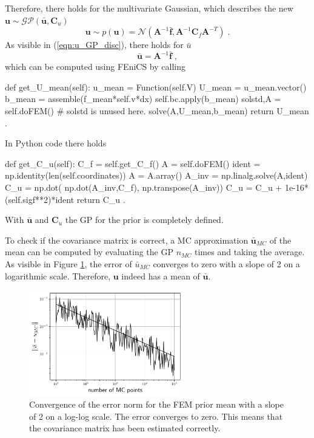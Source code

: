 \documentclass[%
  a4paper,oneside,%
  11pt,%
  smallchapters,
  style=printdev,
  extramargin,
  green,%
  rgb, <cmyk>
  ]{tubsbook}
\begin{document}
%	
Therefore, there holds for the multivariate Gaussian, which describes the new $\bm{u} \sim \mathcal{GP}(\bar{\bm{u}}, \bm{C}_u)$
\begin{equation}
\bm{u} \sim p(\bm{u}) = \mathcal{N} \left( \bm{A}^{-1} \bar{\bm{f}}, \bm{A}^{-1} \bm{C}_f \bm{A}^{-T}  \right) \;.
\label{eqn:u_GP_disc}
\end{equation}
As visible in (\ref{eqn:u_GP_disc}), there holds for $\bar{u}$
\begin{equation}
\bar{\bm{u}} = \bm{A}^{-1} \bar{\bm{f}} \; ,
\end{equation}
which can be computed using FEniCS by calling
\begin{python}
def get_U_mean(self):
	u_mean = Function(self.V)
	U_mean = u_mean.vector()
	b_mean = assemble(f_mean*self.v*dx) 
	self.bc.apply(b_mean)
	solstd,A = self.doFEM()  # solstd is unused here.
	solve(A,U_mean,b_mean)
	return U_mean .
\end{python}
\label{lst:get_u_mean}
In Python code there holds
\begin{python}
def get_C_u(self):
	C_f = self.get_C_f()
	A = self.doFEM()
	ident = np.identity(len(self.coordinates))
	A = A.array()
	A_inv = np.linalg.solve(A,ident)
	C_u = np.dot( np.dot(A_inv,C_f), np.transpose(A_inv))
	C_u = C_u + 1e-16*(self.sigf**2)*ident
	return C_u .
\end{python}
\label{lst:get_C_u}
With $\bar{\bm{u}}$ and $\bm{C}_u$ the GP for the prior is completely defined. 

To check if the covariance matrix is correct, a MC approximation $\bar{\bm{u}}_{MC}$ of the mean can be computed by evaluating the GP $n_{MC}$ times and taking the average. As visible in Figure \ref{fig:u_mean_conv}, the error of $\bar{u}_{MC}$ converges to zero with a slope of 2 on a logarithmic scale. Therefore, $\bm{u}$ indeed has a mean of $\bar{\bm{u}}$.
\begin{figure}[!ht]
\includegraphics[width=0.6\textwidth]{pics/MCerrorConv.pdf}
\centering
\caption[Convergence of the error norm of the FEM prior]{Convergence of the error norm for the FEM prior mean with a slope of 2 on a log-log scale. The error converges to zero. This means that the covariance matrix has been estimated correctly.}
\label{fig:u_mean_conv}
\end{figure}
\end{document}
